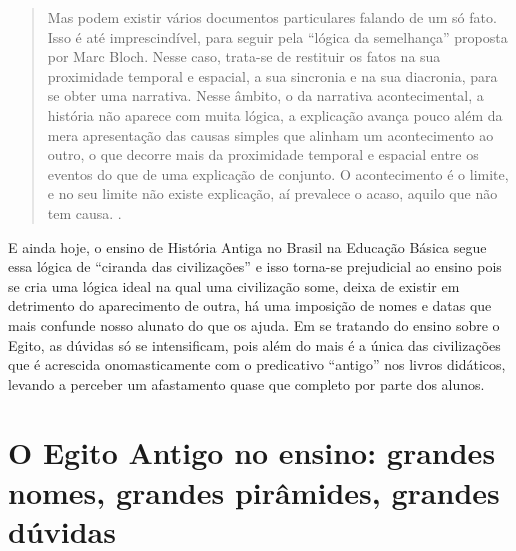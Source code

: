 \begin{refsection}
    \begin{quotation}
        Mas podem existir vários documentos particulares falando de um só fato. Isso é até imprescindível, para seguir pela ``lógica da semelhança'' proposta por Marc Bloch. Nesse caso, trata-se de restituir os fatos na sua proximidade temporal e espacial, a sua sincronia e na sua diacronia, para se obter uma narrativa. Nesse âmbito, o da narrativa acontecimental, a história não aparece com muita lógica, a explicação avança pouco além da mera apresentação das causas simples que alinham um acontecimento ao outro, o que decorre mais da proximidade temporal e espacial entre os eventos do que de uma explicação de conjunto. O acontecimento é o limite, e no seu limite não existe explicação, aí prevalece o acaso, aquilo que não tem causa. \cite[p.~109]{Ribeiro2009Sincronia}.
    \end{quotation}

    E ainda hoje, o ensino de História Antiga no Brasil na Educação Básica segue essa lógica de ``ciranda das civilizações'' e isso torna-se prejudicial ao ensino pois se cria uma lógica ideal na qual uma civilização some, deixa de existir em detrimento do aparecimento de outra, há uma imposição de nomes e datas que mais confunde nosso alunato do que os ajuda. Em se tratando do ensino sobre o Egito, as dúvidas só se intensificam, pois além do mais é a única das civilizações que é acrescida onomasticamente com o predicativo ``antigo'' nos livros didáticos, levando a perceber um afastamento quase que completo por parte dos alunos.

    \section{O Egito Antigo no ensino: grandes nomes, grandes pirâmides, grandes dúvidas}


\end{refsection}
